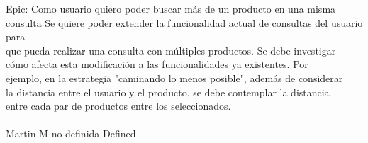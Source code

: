 	{Epic: Como usuario quiero poder buscar más de un producto en una misma consulta} %
	{Se quiere poder extender la funcionalidad actual de consultas del usuario para\\
que pueda realizar una consulta con múltiples productos. Se debe investigar\\
cómo afecta esta modificación a las funcionalidades ya existentes. Por\\
ejemplo, en la estrategia "caminando lo menos posible", además de considerar\\
la distancia entre el usuario y el producto, se debe contemplar la distancia\\
entre cada par de productos entre los seleccionados.\\
\\
} %
	{} %
	{} %
	{Martin M} %
	{no definida} %
	{Defined} %


\vspace{20pt}

